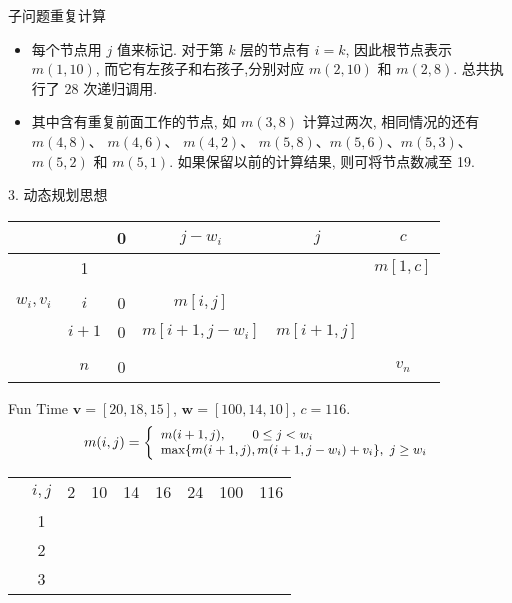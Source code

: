 \documentclass[fontset=fandol,UTF8,fleqn]{beamer}
\begin{document}
\begin{frame}{子问题重复计算}
    \begin{itemize}[<+-|alert@+>]
\item 每个节点用 $j$ 值来标记. 对于第 $k$ 层的节点有 $i=k$, 因此根节点表示 $m(1,10)$, 而它有左孩子和右孩子,分别对应 $m(2,10)$ 和 $m(2,8)$. 总共执行了 $28$ 次递归调用. 
\item 其中含有重复前面工作的节点, 如 $m(3,8)$ 计算过两次, 相同情况的还有 $m(4,8)$、 $m(4,6)$、 $m(4,2)$、 $m(5,8)$、$m(5,6)$、$m(5,3)$、$m(5,2)$ 和 $m(5,1)$. 如果保留以前的计算结果, 则可将节点数减至 19. 
\end{itemize}
\end{frame}

\begin{frame}{3. 动态规划思想}
\begin{table}[c]
  \centering
  \begin{tabular}{rc|c|c|c|c}
&  & 0  & $j-w_i$ & $j$ & $c$ \\
\hline
& 1   &  &  &  & $m[1,c]$  \\
& & & & & \\
 $w_i, v_i$ & $i$ & 0  & $m[i,j]$ &    \\
 & $i+1$ & 0  & $m[i+1,j-w_i]$  & $m[i+1,j]$ &  \\
& & & & & \\
& $n$ & 0  &  & & $v_n$  \\
  \end{tabular}
  \label{tab:knapsack}
\end{table}
\end{frame}

\begin{frame}{Fun Time}
$\mathbf{v}=[20,18,15]$, $\mathbf{w}=[100,14,10]$, $c=116$.
\begin{eqnarray*}
\small{
 m(i,j)=\left\{\begin{array}{ll}
m(i+1, j), \qquad 0\leq j < w_i\\ 
\mathrm{max}\{m(i+1,j), m(i+1, j-w_i)+v_i\},\  j\geq w_i  
\end{array}\right.
}
\end{eqnarray*}

\begin{table}[c]
  \centering
  \begin{tabular}{rc|ccccccc}
& $i,j$ & 2  & 10 & 14 & 16 & 24 & 100 & 116 \\
\cline{2-9}
& 1   &  &  &  &  &  &  &  \\
& 2    &  &  &  &  &  &  &  \\
& 3    &  &  &  &  &  &  &  \\
  \end{tabular}
  \label{tab:knapsack}
\end{table}
\end{frame}
\end{document}
